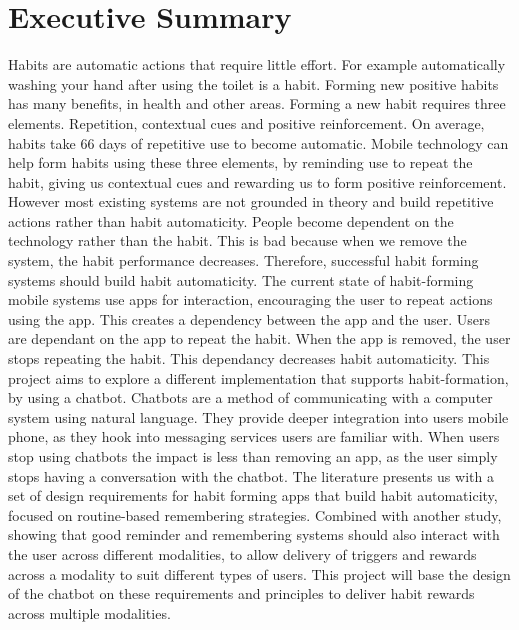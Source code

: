 \section*{Executive Summary}

Habits are automatic actions that require little effort. For example automatically washing your hand after using the toilet is a habit. Forming new positive habits has many benefits, in health and other areas. Forming a new habit requires three elements. Repetition, contextual cues and positive reinforcement. On average, habits take 66 days of repetitive use to become automatic.\newline
\newline
Mobile technology can help form habits using these three elements, by reminding use to repeat the habit, giving us contextual cues and rewarding us to form positive reinforcement. However most existing systems are not grounded in theory and build repetitive actions rather than habit automaticity. People become dependent on the technology rather than the habit. This is bad because when we remove the system, the habit performance decreases. Therefore, successful habit forming systems should build habit automaticity.\newline
\newline
The current state of habit-forming mobile systems use apps for interaction, encouraging the user to repeat actions using the app. This creates a dependency between the app and the user. Users are dependant on the app to repeat the habit. When the app is removed, the user stops repeating the habit. This dependancy decreases habit automaticity.\newline
\newline
This project aims to explore a different implementation that supports habit-formation, by using a chatbot.\newline
Chatbots are a method of communicating with a computer system using natural language. They provide deeper integration into users mobile phone, as they hook into messaging services users are familiar with. When users stop using chatbots the impact is less than removing an app, as the user simply stops having a conversation with the chatbot.\newline
\newline
The literature presents us with a set of design requirements for habit forming apps that build habit automaticity, focused on routine-based remembering strategies. Combined with another study, showing that good reminder and remembering systems should also interact with the user across different modalities, to allow delivery of triggers and rewards across a modality to suit different types of users. This project will base the design of the chatbot on these requirements and principles to deliver habit rewards across multiple modalities.\newline
